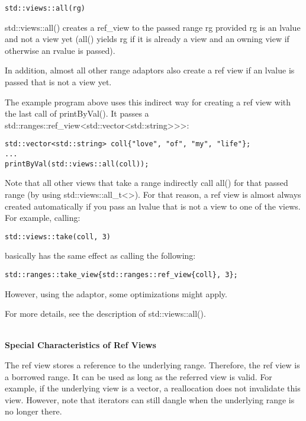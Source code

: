 \begin{lstlisting}[style=styleCXX]
std::views::all(rg)
\end{lstlisting}

std::views::all() creates a ref\_view to the passed range rg provided rg is an lvalue and not a view yet (all() yields rg if it is already a view and an owning view if otherwise an rvalue is passed).

In addition, almost all other range adaptors also create a ref view if an lvalue is passed that is not a view yet.

The example program above uses this indirect way for creating a ref view with the last call of printByVal(). It passes a std::ranges::ref\_view<std::vector<std::string>{}>{}>:

\begin{lstlisting}[style=styleCXX]
std::vector<std::string> coll{"love", "of", "my", "life"};
...
printByVal(std::views::all(coll));
\end{lstlisting}

Note that all other views that take a range indirectly call all() for that passed range (by using std::views::all\_t<>). For that reason, a ref view is almost always created automatically if you pass an lvalue that is not a view to one of the views. For example, calling:

\begin{lstlisting}[style=styleCXX]
std::views::take(coll, 3)
\end{lstlisting}

basically has the same effect as calling the following:

\begin{lstlisting}[style=styleCXX]
std::ranges::take_view{std::ranges::ref_view{coll}, 3};
\end{lstlisting}

However, using the adaptor, some optimizations might apply.

For more details, see the description of std::views::all().

\noindent
\hspace*{\fill} \\ %
\textbf{Special Characteristics of Ref Views}

The ref view stores a reference to the underlying range. Therefore, the ref view is a borrowed range. It can be used as long as the referred view is valid. For example, if the underlying view is a vector, a reallocation does not invalidate this view. However, note that iterators can still dangle when the underlying range is no longer there.


